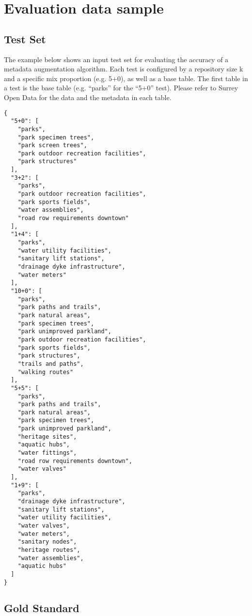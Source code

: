 \chapter{Evaluation data sample}

\section{Test Set}
\label{sec:TestSet}

The example below shows an input test set for evaluating the accuracy of a metadata augmentation algorithm. Each test is configured by a repository size k and a specific mix proportion (e.g. 5+0), as well as a base table. The first table in a test is the base table (e.g. “parks” for the “5+0” test). Please refer to Surrey Open Data for the data and the metadata in each table.

\begin{lstlisting}
{
  "5+0": [
    "parks",
    "park specimen trees",
    "park screen trees",
    "park outdoor recreation facilities",
    "park structures"
  ],
  "3+2": [
    "parks",
    "park outdoor recreation facilities",
    "park sports fields",
    "water assemblies",
    "road row requirements downtown"
  ],
  "1+4": [
    "parks",
    "water utility facilities",
    "sanitary lift stations",
    "drainage dyke infrastructure",
    "water meters"
  ],
  "10+0": [
    "parks",
    "park paths and trails",
    "park natural areas",
    "park specimen trees",
    "park unimproved parkland",
    "park outdoor recreation facilities",
    "park sports fields",
    "park structures",
    "trails and paths",
    "walking routes"
  ],
  "5+5": [
    "parks",
    "park paths and trails",
    "park natural areas",
    "park specimen trees",
    "park unimproved parkland",
    "heritage sites",
    "aquatic hubs",
    "water fittings",
    "road row requirements downtown",
    "water valves"
  ],
  "1+9": [
    "parks",
    "drainage dyke infrastructure",
    "sanitary lift stations",
    "water utility facilities",
    "water valves",
    "water meters",
    "sanitary nodes",
    "heritage routes",
    "water assemblies",
    "aquatic hubs"
  ]
}
\end{lstlisting}

\section{Gold Standard}
\label{sec:Gold Standard}

